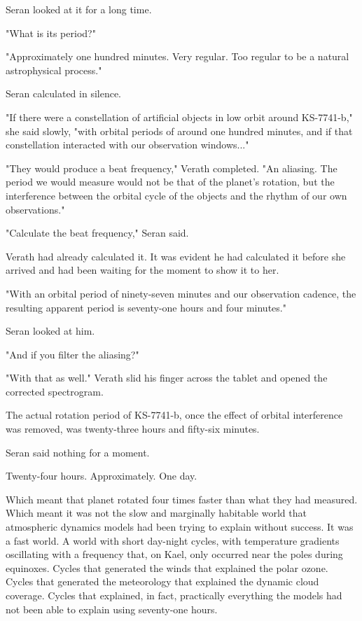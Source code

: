 \documentclass[11pt,a5paper,twoside]{book}
\begin{document}
Seran looked at it for a long time.

"What is its period?"

"Approximately one hundred minutes. Very regular. Too regular to be a natural astrophysical process."

Seran calculated in silence.

"If there were a constellation of artificial objects in low orbit around KS-7741-b," she said slowly, "with orbital periods of around one hundred minutes, and if that constellation interacted with our observation windows..."

"They would produce a beat frequency," Verath completed. "An aliasing. The period we would measure would not be that of the planet's rotation, but the interference between the orbital cycle of the objects and the rhythm of our own observations."

"Calculate the beat frequency," Seran said.

Verath had already calculated it. It was evident he had calculated it before she arrived and had been waiting for the moment to show it to her.

"With an orbital period of ninety-seven minutes and our observation cadence, the resulting apparent period is seventy-one hours and four minutes."

Seran looked at him.

"And if you filter the aliasing?"

"With that as well." Verath slid his finger across the tablet and opened the corrected spectrogram.

The actual rotation period of KS-7741-b, once the effect of orbital interference was removed, was twenty-three hours and fifty-six minutes.

Seran said nothing for a moment.

Twenty-four hours. Approximately. One day.

Which meant that planet rotated four times faster than what they had measured. Which meant it was not the slow and marginally habitable world that atmospheric dynamics models had been trying to explain without success. It was a fast world. A world with short day-night cycles, with temperature gradients oscillating with a frequency that, on Kael, only occurred near the poles during equinoxes. Cycles that generated the winds that explained the polar ozone. Cycles that generated the meteorology that explained the dynamic cloud coverage. Cycles that explained, in fact, practically everything the models had not been able to explain using seventy-one hours.
\end{document}
